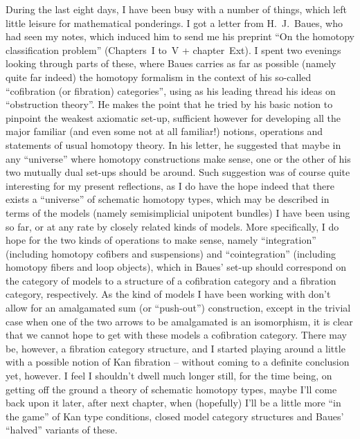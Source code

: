 \bigbreak

\presectionfill{}\par

\label{sec:125}%
During the last eight days, I have been busy with a number of things,
which left little leisure for mathematical ponderings. I got a letter
from H.~J.~Baues, who had seen my notes, which induced him to send me
his preprint ``On the homotopy classification problem'' (Chapters~I
to~V + chapter~Ext). I spent two evenings looking through parts of
these, where Baues carries as far as possible (namely quite far
indeed) the homotopy formalism in the context of his so-called
``cofibration (or fibration) categories'', using as his leading
thread his ideas on ``obstruction theory''. He makes the point that he
tried by his basic notion to pinpoint the weakest axiomatic set-up,
sufficient however for developing all the major familiar (and even
some not at all familiar!) notions, operations and statements of usual
homotopy theory. In his letter, he suggested that maybe in any
``universe'' where homotopy constructions make sense, one or the other
of his two mutually dual set-ups should be around. Such suggestion was
of course quite interesting for my present reflections, as I do have
the hope indeed that there exists a ``universe'' of schematic homotopy
types, which may be described in terms of the models (namely
semisimplicial unipotent bundles) I have been using so far, or at any
rate by closely related kinds of models. More specifically, I do hope
for the two kinds of operations to make sense, namely ``integration''
(including homotopy cofibers and suspensions) and ``cointegration''
(including homotopy fibers and loop objects), which in Baues' set-up
should correspond on the category of models to a structure of a
cofibration category and a fibration category, respectively. As the
kind of models I have been working with don't allow for an
amalgamated sum (or ``push-out'') construction, except in the trivial
case when one of the two arrows to be amalgamated is an isomorphism,
it is clear that we cannot hope to get with these models a cofibration
category. There may be, however, a fibration category structure, and I
started playing around a little with a possible notion of Kan
fibration -- without coming to a definite conclusion yet, however. I
feel I shouldn't dwell much longer still, for the time being, on
getting off the ground a theory of schematic homotopy types, maybe
I'll come back upon it later, after next chapter, when (hopefully)
I'll be a little more ``in the game'' of Kan type conditions, closed
model category structures and Baues' ``halved'' variants of these.

